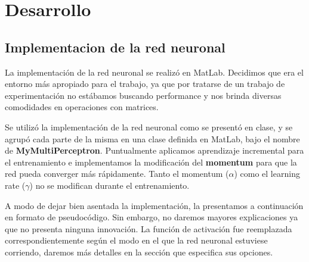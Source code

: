 \documentclass[informe.tex]{subfiles}
\begin{document}
  
  \section{Desarrollo}
  
  \subsection{Implementacion de la red neuronal}
    La implementación de la red neuronal se realizó en MatLab. Decidimos que era el entorno más apropiado para el trabajo, ya que por tratarse de un trabajo de experimentación no estábamos buscando performance y nos brinda diversas comodidades en operaciones con matrices. 
    
    Se utilizó la implementación de la red neuronal como se presentó en clase, y se agrupó cada parte de la misma en una clase definida en MatLab, bajo el nombre de \textbf{MyMultiPerceptron}. Puntualmente aplicamos aprendizaje incremental para el entrenamiento e implementamos la modificación del \textbf{momentum} para que la red pueda converger más rápidamente. Tanto el momentum ($\alpha$) como el learning rate ($\gamma$) no se modifican durante el entrenamiento.
    
    A modo de dejar bien asentada la implementación, la presentamos a continuación en formato de pseudocódigo. Sin embargo, no daremos mayores explicaciones ya que no presenta ninguna innovación. La función de activación fue reemplazada correspondientemente según el modo en el que la red neuronal estuviese corriendo, daremos más detalles en la sección que especifica sus opciones.
  
    \vspace{15pt}
    
\end{document}

